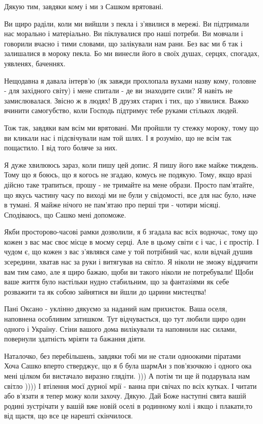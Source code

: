 Дякую тим, завдяки кому і ми з Сашком врятовані. 

Ви щиро раділи, коли ми вийшли з пекла і з’явилися в мережі. Ви підтримали нас
морально і матеріально. Ви піклувалися про наші потреби. Ви мовчали і говорили
вчасно і тими словами, що залікували нам рани. Без вас ми б так і залишалися в
мороку пекла. Бо ми винесли його в своїх душах, серцях, спогадах, уявленях,
баченнях.

Нещодавна я давала інтерв’ю (як завжди прохлопала вухами назву кому, головне -
для західного світу) і мене спитали - де ви знаходите сили? Я навіть не
замислювалася. Звісно ж в людях! В друзях старих і тих, що з’явилися. Важко
вчинити самогубство, коли Господь підтримує тебе руками стількох людей.

Тож так, завдяки вам всім ми врятовані. Ми пройшли ту стежку мороку, тому що ви
кликали нас і підсвічували нам той шлях. І я розумію, що не всім так пощастило.
І від того боляче за них.

Я дуже хвилююсь зараз, коли пишу цей допис. Я пишу його вже майже тиждень. Тому
що я боюсь, що я когось не згадаю, комусь не подякую. Тому, якщо вразі дійсно
таке трапиться, прошу - не тримайте на мене образи. Просто пам’ятайте, що якусь
частину часу по виході ми не були у свідомості, все для нас було, наче в
тумані. Я майже нічого не пам’ятаю про перші три - чотири місяці. Сподіваюсь,
що Сашко мені допоможе.

Якби просторово-часові рамки дозволили, я б згадала вас всіх водночас, тому що
кожен з вас має своє місце в моєму серці. Але в цьому світи є і час, і є
простір. І чудом є, що кожен з вас з’являвся саме у той потрібний час, коли
відчай душив зсередини, хватав нас за руки і витягував на світло. Я ніколи не
зможу віддячити вам тим само, але я щиро бажаю, щоби ви такого ніколи не
потребували! Щоби ваше життя було настільки нудно стабильним, що за фантазіями
як себе розважити та як собою зайнятися ви йшли до царини мистецтва!

Пані Оксано - уклінно дякуємо за наданий нам прихисток. Ваша оселя, наповнена
особливим затишком. Тут відчувається, що тут любили щиро один одного і Україну.
Стіни вашого дома вилікували та наповнили нас силами, повернули здатність
мріяти та бажання діяти. 

Наталочко, без перебільшень, завдяки тобі ми не стали одноокими піратами 🙂
Хоча Сашко вперто стверджує, що я б була шармАн з пов’язочкою і одного ока мені
цілком би вистачало виразно глядіти. ))) А потім ти ще й подарувала нам світло
)))) І втілення моєї дурної мрії - ванна при свічах по всіх кутках. І читати
або в’язати я тепер можу коли захочу. Дякую. Дай Боже наступні свята вашій
родині зустрічати у вашій вже новій оселі в родинному колі і якщо і плакати,то
від щастя, що все це нарешті скінчилося.

